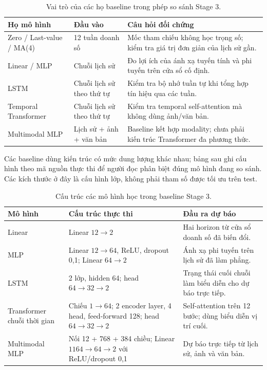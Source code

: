\documentclass[12pt,a4paper,oneside]{article}
\begin{document}
\begin{table}[!htbp]
\centering
\small
\caption{Vai trò của các họ baseline trong phép so sánh Stage 3.}
\label{tab:model-families}
\begin{tabularx}{\textwidth}{p{}p{}X}
\toprule
Họ mô hình & Đầu vào & Câu hỏi đối chứng \\
\midrule
Zero / Last-value / MA(4) & 12 tuần doanh số & Mốc tham chiếu không học trọng số; kiểm tra giá trị đơn giản của lịch sử gần. \\
Linear / MLP & Chuỗi lịch sử & Đo lợi ích của ánh xạ tuyến tính và phi tuyến trên cửa sổ cố định. \\
LSTM & Chuỗi lịch sử theo thứ tự & Kiểm tra bộ nhớ tuần tự khi tổng hợp tín hiệu qua các tuần. \\
Temporal Transformer & Chuỗi lịch sử theo thứ tự & Kiểm tra temporal self-attention mà không dùng ảnh/văn bản. \\
Multimodal MLP & Lịch sử + ảnh + văn bản & Baseline kết hợp modality; chưa phải kiến trúc Transformer đa phương thức. \\
\bottomrule
\end{tabularx}
\end{table}

Các baseline dùng kiến trúc có mức dung lượng khác nhau; bảng sau ghi cấu hình theo mã nguồn thực thi để người đọc phân biệt đúng mô hình đang so sánh. Các kích thước ở đây là cấu hình lớp, không phải tham số được tối ưu trên test.

\begin{table}[!htbp]
\centering
\small
\caption{Cấu trúc các mô hình học trong baseline Stage 3.}
\label{tab:architectures}
\begin{tabularx}{\textwidth}{p{}p{}X}
\toprule
Mô hình & Cấu trúc thực thi & Đầu ra dự báo \\
\midrule
Linear & Linear $12\rightarrow2$ & Hai horizon từ cửa sổ doanh số đã biến đổi. \\
MLP & Linear $12\rightarrow64$, ReLU, dropout 0,1; Linear $64\rightarrow2$ & Ánh xạ phi tuyến trên lịch sử đã làm phẳng. \\
LSTM & 2 lớp, hidden 64; head $64\rightarrow32\rightarrow2$ & Trạng thái cuối chuỗi làm biểu diễn cho dự báo trực tiếp. \\
Transformer chuỗi thời gian & Chiếu $1\rightarrow64$; 2 encoder layer, 4 head, feed-forward 128; head $64\rightarrow32\rightarrow2$ & Self-attention trên 12 bước; dùng biểu diễn vị trí cuối. \\
Multimodal MLP & Nối 12 + 768 + 384 chiều; Linear $1164\rightarrow64\rightarrow2$ với ReLU/dropout 0,1 & Dự báo trực tiếp từ lịch sử, ảnh và văn bản. \\
\bottomrule
\end{tabularx}
\end{table}
\end{document}
